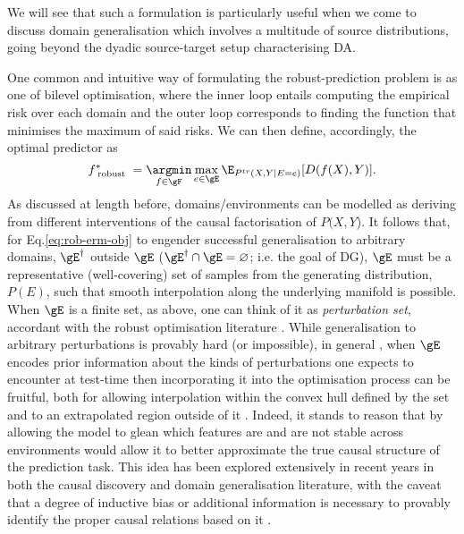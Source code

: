 %
We will see that such a formulation is particularly useful when we come to discuss domain
generalisation which involves a multitude of source distributions, going beyond the dyadic
source-target setup characterising DA.


One common \citep{arjovsky2019invariant, krueger2021out, sagawa2019distributionally} and intuitive way
of formulating the robust-prediction problem is as one of bilevel optimisation, where the inner
loop entails computing the empirical risk over each domain and the outer loop corresponds to
finding the function that minimises the maximum of said risks.
%
We can then define, accordingly, the optimal predictor as 
%
\begin{equation}\label{eq:rob-erm-obj} 
    f^\ast_\text{ robust } =
    \underset{ f \in \gF }{ \argmin }\, 
    \underset{ e \in \gE}{ \mathrm{max} }\,
    \E_{ P^{tr}( X, Y | E = e ) } [ D ( f( X ), Y ) ]. 
\end{equation}
%
As discussed at length before, domains/environments can be modelled as deriving from different
interventions of the causal factorisation of \(P(X, Y\)).
%
It follows that, for Eq.\ref{eq:rob-erm-obj} to engender successful generalisation to arbitrary
domains, \(\gE^\dagger\) outside \(\gE\) (\( \gE^\dagger \cap \gE = \varnothing \); i.e. the goal
of DG), \(\gE\) must be a representative (well-covering) set of samples from the generating
distribution, \( P(E) \), such that smooth interpolation along the underlying manifold is possible.
%
When \(\gE\) is a finite set, as above, one can think of it as \emph{perturbation set},
accordant with the robust optimisation literature \citep{ben2009robust}.
%
While generalisation to arbitrary perturbations is provably hard (or impossible), in general
\citep{david2010impossibility}, when \(\gE\) encodes prior information about the kinds of
perturbations one expects to encounter at test-time then incorporating it into the optimisation
process can be fruitful, both for allowing interpolation within the convex hull defined by the
set and to an extrapolated region outside of it \citep{krueger2021out}.
%
Indeed, it stands to reason that by allowing the model to glean which features are and are not
stable across environments would allow it to better approximate the true causal structure of the
prediction task. 
%
This idea has been explored extensively in recent years in both the causal discovery
\citep{peters2016causal, bengio2019meta} and domain generalisation \citep{arjovsky2019invariant,
ahuja2020invariant, creager2021environment} literature, with the caveat that a degree of
inductive bias or additional information is necessary to provably identify the proper causal
relations based on it \citep{lin2022zin}.
%

